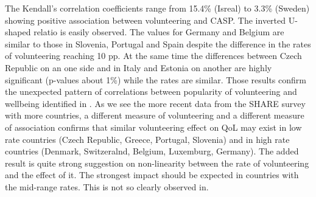 \documentclass[10pt, letterpaper]{article}
\begin{document}
\begin{spacing}{1.4}

The Kendall's correlation coefficients range from 15.4\% (Isreal) to 3.3\% (Sweden) showing positive association between volunteering and CASP. The inverted U-shaped relatio is easily observed. The values for Germany and Belgium are similar to those in Slovenia, Portugal and Spain despite the difference in the rates of volunteering reaching 10 pp. At the same time the differences between Czech Republic on an one side and in Italy and Estonia on another are highly significant (p-values about 1\%) while the rates are similar. Those results confirm the unexpected pattern of correlations between  popularity of volunteering and wellbeing identified in \citet{haski09}. As we see the more recent data from the SHARE survey with more countries, a different measure of volunteering and a different measure of association confirms that similar volunteering effect on QoL may exist in low rate countries (Czech Republic, Greece, Portugal, Slovenia) and in high rate countries (Denmark, Switzeralnd, Belgium, Luxemburg, Germany). The added result is quite  strong suggestion on non-linearity between the rate of volunteering and the effect of it. The strongest impact should be expected in countries with the mid-range rates. This is not so clearly observed in\citet{haski09}. \\


\end{spacing}
\end{document}

